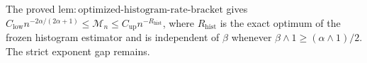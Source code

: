 The proved \(\mathrm{lem:optimized\text{-}histogram\text{-}rate\text{-}bracket}\) gives \(C_{\mathrm{low}}n^{-2\alpha/(2\alpha+1)}\le\mathcal M_n\le C_{\mathrm{up}}n^{-R_{\mathrm{hist}}}\), where \(R_{\mathrm{hist}}\) is the exact optimum of the frozen histogram estimator and is independent of \(\beta\) whenever \(\beta\wedge1\ge(\alpha\wedge1)/2\). The strict exponent gap remains.